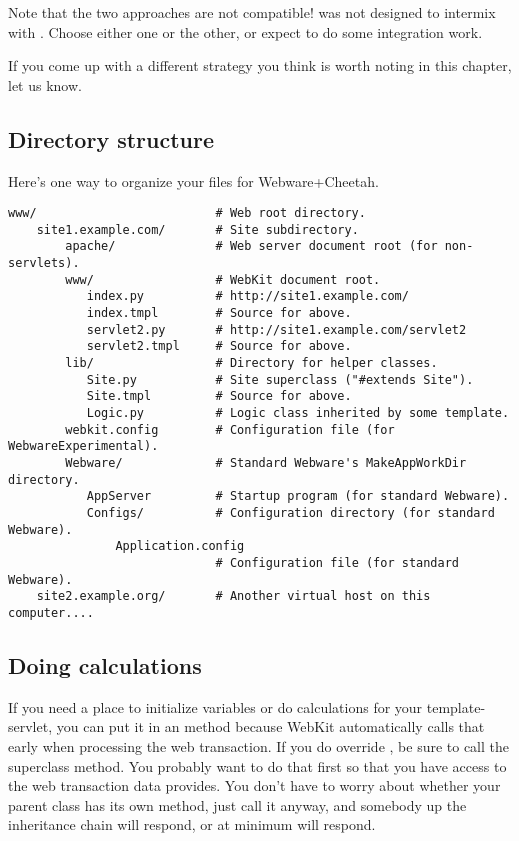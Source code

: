 Note that the two approaches are not compatible!   was not
designed to intermix with .  Choose either
one or the other, or expect to do some integration work.  

If you come up with a different strategy you think is worth noting in this
chapter, let us know.


\subsection{Directory structure}
\label{webware.directoryStructure}

Here's one way to organize your files for Webware+Cheetah.

\begin{verbatim}
www/                         # Web root directory.
    site1.example.com/       # Site subdirectory.
        apache/              # Web server document root (for non-servlets).
        www/                 # WebKit document root. 
           index.py          # http://site1.example.com/
           index.tmpl        # Source for above.
           servlet2.py       # http://site1.example.com/servlet2
           servlet2.tmpl     # Source for above.
        lib/                 # Directory for helper classes.
           Site.py           # Site superclass ("#extends Site").
           Site.tmpl         # Source for above.
           Logic.py          # Logic class inherited by some template.
        webkit.config        # Configuration file (for WebwareExperimental).
        Webware/             # Standard Webware's MakeAppWorkDir directory.
           AppServer         # Startup program (for standard Webware).
           Configs/          # Configuration directory (for standard Webware).
               Application.config
                             # Configuration file (for standard Webware). 
    site2.example.org/       # Another virtual host on this computer....
\end{verbatim}



\subsection{Doing calculations}
\label{webware.calculations}

If you need a place to initialize variables or do calculations for your
template-servlet, you can put it in an  method because WebKit
automatically calls that early when processing the web transaction.  If you
do override , be sure to call the superclass 
method.  You probably want to do that first so that you have access to the
web transaction data  provides.  You don't have to worry
about whether your parent class has its own  method, just call
it anyway, and somebody up the inheritance chain will respond, or at minimum
 will respond.

